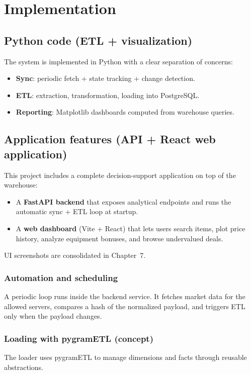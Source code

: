 \chapter{Implementation}

\section{Python code (ETL + visualization)}
The system is implemented in Python with a clear separation of concerns:
\begin{itemize}
  \item \textbf{Sync}: periodic fetch + state tracking + change detection.
  \item \textbf{ETL}: extraction, transformation, loading into PostgreSQL.
  \item \textbf{Reporting}: Matplotlib dashboards computed from warehouse queries.
\end{itemize}

\section{Application features (API + React web application)}
This project includes a complete decision-support application on top of the warehouse:
\begin{itemize}
  \item A \textbf{FastAPI backend} that exposes analytical endpoints and runs the automatic sync + ETL loop at startup.
  \item A \textbf{web dashboard} (Vite + React) that lets users search items, plot price history, analyze equipment bonuses, and browse undervalued deals.
\end{itemize}

UI screenshots are consolidated in Chapter~7.

\subsection{Automation and scheduling}
A periodic loop runs inside the backend service. It fetches market data for the allowed servers, compares a hash of the normalized payload, and triggers ETL only when the payload changes.


\subsection{Loading with pygramETL (concept)}
The loader uses pygramETL to manage dimensions and facts through reusable abstractions.

